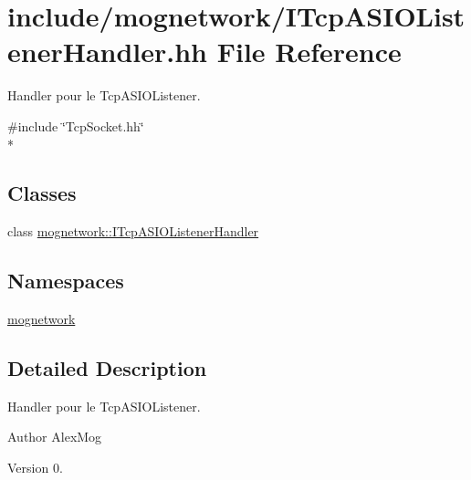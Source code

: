 \hypertarget{_i_tcp_a_s_i_o_listener_handler_8hh}{\section{include/mognetwork/\-I\-Tcp\-A\-S\-I\-O\-Listener\-Handler.hh File Reference}
\label{_i_tcp_a_s_i_o_listener_handler_8hh}
}


Handler pour le Tcp\-A\-S\-I\-O\-Listener.  


{\ttfamily \#include \char`\"{}Tcp\-Socket.\-hh\char`\"{}}\\*
\subsection*{Classes}
\begin{DoxyCompactItemize}
\item 
class \hyperlink{classmognetwork_1_1_i_tcp_a_s_i_o_listener_handler}{mognetwork\-::\-I\-Tcp\-A\-S\-I\-O\-Listener\-Handler}
\end{DoxyCompactItemize}
\subsection*{Namespaces}
\begin{DoxyCompactItemize}
\item 
\hyperlink{namespacemognetwork}{mognetwork}
\end{DoxyCompactItemize}


\subsection{Detailed Description}
Handler pour le Tcp\-A\-S\-I\-O\-Listener. \begin{DoxyAuthor}{Author}
Alex\-Mog 
\end{DoxyAuthor}
\begin{DoxyVersion}{Version}
0. 
\end{DoxyVersion}
